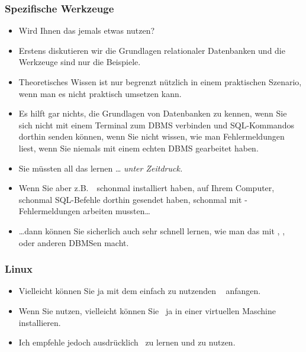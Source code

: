 \documentclass[aspectratio=169,mathserif,notheorems]{beamer}%
\begin{document}
%
\begin{frame}%
\frametitle{Spezifische Werkzeuge}%
\begin{itemize}%
\item Wird Ihnen das jemals etwas nutzen?%
\item<3-> Erstens diskutieren wir die Grundlagen relationaler Datenbanken und die Werkzeuge sind nur die Beispiele.%
\item<4-> Theoretisches Wissen ist nur begrenzt nützlich in einem praktischen Szenario, wenn man es nicht praktisch umsetzen kann.%
\item<5-> Es hilft gar nichts, die Grundlagen von Datenbanken zu kennen, wenn Sie sich nicht mit einem Terminal zum DBMS verbinden und SQL-Kommandos dorthin senden können, wenn Sie nicht wissen, wie man Fehlermeldungen liest, wenn Sie niemals mit einem echten DBMS gearbeitet haben.%
\item<6-> Sie müssten all das lernen {\dots} \emph{unter Zeitdruck.}%
\item<7-> Wenn Sie aber z.B.\ \postgresql\ schonmal installiert haben, auf Ihrem Computer, schonmal SQL-Befehle dorthin gesendet haben, schonmal mit \postgresql-Fehlermeldungen arbeiten mussten\dots%
\item<8-> {\dots}dann können Sie sicherlich auch sehr schnell lernen, wie man das mit \mysql, \mariadb, oder anderen DBMSen macht.%
\end{itemize}%
\end{frame}%
%
\begin{frame}%
\frametitle{Linux}%
%
%
\begin{itemize}%
\item Vielleicht können Sie ja mit dem einfach zu nutzenden \ubuntu\ \linux\cite{CN2020ULB,H2020ULU2E} anfangen.%
\item<2-> Wenn Sie \microsoftWindows\cite{B2023W1IO} nutzen, vielleicht können Sie \ubuntu\ ja in einer virtuellen Maschine installieren.%
\item<3-> Ich empfehle jedoch ausdrücklich \linux\ zu lernen und zu nutzen.%
\end{itemize}%
\end{frame}%
%
\end{document}
